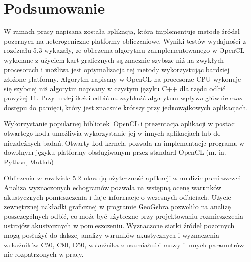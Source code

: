\chapter{Podsumowanie}\label{cha:podsum}

W ramach pracy napisana została aplikacja, która implementuje metodę źródeł pozornych na heterogeniczne platformy obliczeniowe. Wyniki testów wydajności z rozdziału 5.3 wykazały, że obliczenia algorytmu zaimplementowanego w OpenCL wykonane z użyciem kart graficznych są znacznie szybsze niż na zwykłych procesorach i możliwa jest optymalizacja tej metody wykorzystując bardziej złożone platformy. Algorytm napisany w OpenCL na procesorze CPU wykonuje się szybciej niż algorytm napisany w czystym języku C++ dla rzędu odbić powyżej 11. Przy małej ilości odbić na szybkość algorytmu wpływa głównie czas dostępu do pamięci, który jest znacznie krótszy przy jednowątkowych aplikacjach.    

Wykorzystanie popularnej biblioteki OpenCL i prezentacja aplikacji w postaci otwartego kodu umożliwia wykorzystanie jej w innych aplikacjach  lub do niezależnych badań. Otwarty kod kernela pozwala na implementacje programu w dowolnym języku platformy obsługiwanym przez standard OpenCL (m. in. Python, Matlab).

Obliczenia w rozdziale 5.2 ukazują użyteczność aplikacji w analizie pomieszczeń. Analiza wyznaczonych echogramów pozwala na wstępną ocenę warunków akustycznych pomieszczenia i daje informacje o wczesnych odbiciach. Użycie zewnętrznej nakładki graficznej w programie GeoGebra pozwoliło na analizę poszczególnych odbić, co może być użyteczne przy projektowaniu rozmieszczenia ustrojów akustycznych w pomieszczeniu. Wyznaczone siatki źródeł pozornych mogą posłużyć do dalszej analizy warunków akustycznych i wyznaczenia wskaźników C50, C80, D50, wskaźnika zrozumiałości mowy i innych parametrów nie rozpatrzonych w pracy.